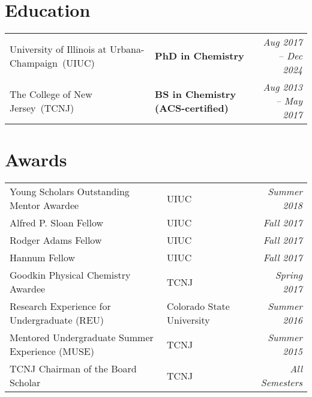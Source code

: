 \documentclass[letterpaper,10pt]{article}
\newcommand{\sectionspace}{
\vspace{-17pt}
}
\begin{document}
\section{\textcolor{color1}{Education}}
\vspace{-3pt}
{
	\setlength\tabcolsep{0pt}
	\begin{tabular*}{\linewidth}{@{\extracolsep{\fill}} llr}
		University of Illinois at Urbana-Champaign~(UIUC) & \textbf{PhD in Chemistry} & \textcolor{color2}{\textit{Aug 2017 -- Dec 2024}}\\
		The College of New Jersey~(TCNJ) & \textbf{BS in Chemistry (ACS-certified)} & \textcolor{color2}{\textit{Aug 2013 -- May 2017}}\\
	\end{tabular*}
}
\sectionspace
\vspace{3pt}

\section{\textcolor{color1}{Awards}}
{
	\setlength\tabcolsep{0pt}
	\begin{tabular*}{\linewidth}{@{\extracolsep{\fill}} llr}
		Young Scholars Outstanding Mentor Awardee & UIUC & \textcolor{color2}{\textit{Summer 2018}}\\
		Alfred P. Sloan Fellow & UIUC & \textcolor{color2}{\textit{Fall 2017}}\\
		Rodger Adams Fellow & UIUC & \textcolor{color2}{\textit{Fall 2017}}\\
		Hannum Fellow & UIUC & \textcolor{color2}{\textit{Fall 2017}}\\
		Goodkin Physical Chemistry Awardee & TCNJ & \textcolor{color2}{\textit{Spring 2017}}\\
		Research Experience for Undergraduate (REU) & Colorado State University & \textcolor{color2}{\textit{Summer 2016}}\\
		Mentored Undergraduate Summer Experience (MUSE) & TCNJ & \textcolor{color2}{\textit{Summer 2015}}\\
		TCNJ Chairman of the Board Scholar & TCNJ & \textcolor{color2}{\textit{All Semesters}}\\
	\end{tabular*}
}
\sectionspace
\vspace{6pt}
\end{document}

